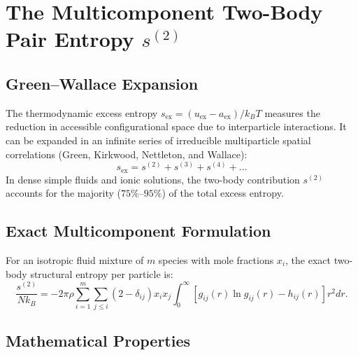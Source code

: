 \documentclass[11pt,a4paper]{article}
\begin{document}
\section{The Multicomponent Two-Body Pair Entropy $s^{(2)}$}

\subsection{Green--Wallace Expansion}

The thermodynamic excess entropy $s_{\text{ex}} = (u_{\text{ex}} - a_{\text{ex}})/k_B T$ measures the reduction in accessible configurational space due to interparticle interactions. It can be expanded in an infinite series of irreducible multiparticle spatial correlations (Green, Kirkwood, Nettleton, and Wallace):
\begin{equation}
s_{\text{ex}} = s^{(2)} + s^{(3)} + s^{(4)} + \dots
\end{equation}
In dense simple fluids and ionic solutions, the two-body contribution $s^{(2)}$ accounts for the majority ($75\%\text{--}95\%$) of the total excess entropy.

\subsection{Exact Multicomponent Formulation}

For an isotropic fluid mixture of $m$ species with mole fractions $x_i$, the exact two-body structural entropy per particle is:
\begin{equation}
\label{eq:s2_multicomp}
\frac{s^{(2)}}{N k_B} = - 2\pi \rho \sum_{i=1}^{m} \sum_{j \le i} \left(2 - \delta_{ij}\right) x_i x_j \int_0^{\infty} \left[ g_{ij}(r) \ln g_{ij}(r) - h_{ij}(r) \right] r^2 dr.
\end{equation}

\subsection{Mathematical Properties}
\end{document}
